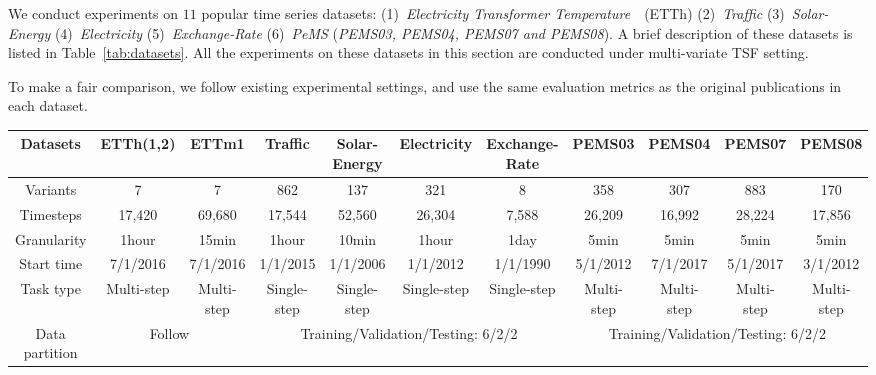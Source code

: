 \documentclass{article}
\begin{document}
We conduct experiments on $11$ popular time series datasets: (1)~\emph{Electricity Transformer Temperature}~\citep{Zhou2020InformerBE}~(ETTh) 
(2)~\emph{Traffic}
(3)~\emph{Solar-Energy}
(4)~\emph{Electricity}
(5)~\emph{Exchange-Rate}
(6)~\textit{PeMS} (\emph{PEMS03, PEMS04, PEMS07 and PEMS08}). 
A brief description of these datasets is listed in Table~\ref{tab:datasets}. All the experiments on these datasets in this section are conducted under multi-variate TSF setting. 

To make a fair comparison, we follow existing experimental settings, and use the same evaluation metrics as the original publications \citep{Hyndman2006AnotherLA, Makridakis1982TheAO, xu2021autoformer, Lai2018ModelingLA} in each dataset. 

\begin{table*}[t]
\caption{The overall information of the $11$ datasets.}
\begin{center}
\scriptsize
\resizebox{\textwidth}{!}
{
\begin{tabular}{c|cc|cccc|cccc}
\hline
Datasets       & ETTh(1,2)     & ETTm1          & Traffic     & Solar-Energy & Electricity & Exchange-Rate & PEMS03       & PEMS04      & PEMS07      & PEMS08      \\ \hline
Variants       & 7             & 7              & 862         & 137          & 321         & 8             & 358          & 307         & 883         & 170         \\
Timesteps      & 17,420        & 69,680         & 17,544      & 52,560       & 26,304      & 7,588         & 26,209       & 16,992      & 28,224      & 17,856      \\
Granularity    & 1hour         & 15min          & 1hour       & 10min        & 1hour       & 1day          & 5min         & 5min        & 5min        & 5min        \\
Start time     & 7/1/2016      & 7/1/2016       & 1/1/2015       & 1/1/2006    & 1/1/2012     & 1/1/1990    & 5/1/2012      & 7/1/2017     & 5/1/2017    & 3/1/2012    \\
Task type      & Multi-step    & Multi-step     & Single-step & Single-step  & Single-step & Single-step   & Multi-step   & Multi-step  & Multi-step  & Multi-step  \\ \hline
Data partition & \multicolumn{2}{c|}{Follow~\citep{Zhou2020InformerBE}}          & \multicolumn{4}{c|}{Training/Validation/Testing: 6/2/2}  & \multicolumn{4}{c}{Training/Validation/Testing: 6/2/2} \\ \hline
\end{tabular}}
\end{center}

\label{tab:datasets}
\end{table*}
\end{document}
